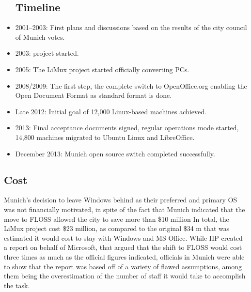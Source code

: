 \begin{itemize}
\subsection{Timeline}

\item 2001–2003: First plans and discussions based on the results of the city council of Munich votes.
\item 2003: project started.
\item 2005: The LiMux project started officially converting PCs.
\item 2008/2009: The first step, the complete switch to OpenOffice.org enabling the Open Document Format as standard format is done.
\item Late 2012: Initial goal of 12,000 Linux-based machines achieved.
\item  2013: Final acceptance documents signed, regular operations mode started, 14,800 machines migrated to Ubuntu Linux and LibreOffice.
\item December 2013: Munich open source switch completed successfully.

\end{itemize}
\subsection{Cost}

Munich’s decision to leave Windows behind as their preferred and primary OS was not financially motivated, in spite of the fact that Munich indicated that the move to FLOSS allowed the city to save more than \$10 million In total, the LiMux project cost  \$23 million, as compared to the original  \$34 m  that was estimated it would cost to stay with Windows and MS Office. While HP created a report on behalf of Microsoft, that argued that the shift to FLOSS would cost three times as much as the official figures indicated, officials in Munich were able to show that the report was based off of a variety of flawed assumptions, among them being the overestimation of the number of staff it would take to accomplish the task.


